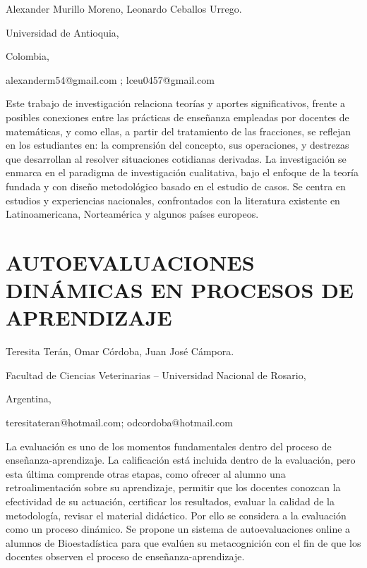\begin{datos}

Alexander Murillo Moreno, Leonardo Ceballos Urrego.

Universidad de Antioquia,

Colombia,

alexanderm54@gmail.com ; lceu0457@gmail.com

\end{datos}

Este trabajo de investigación relaciona teorías y aportes significativos,
frente a posibles conexiones entre las prácticas de enseñanza empleadas
por docentes de matemáticas, y como ellas, a partir del tratamiento
de las fracciones, se reflejan en los estudiantes en: la comprensión
del concepto, sus operaciones, y destrezas que desarrollan al resolver
situaciones cotidianas derivadas. La investigación se enmarca en el
paradigma de investigación cualitativa, bajo el enfoque de la teoría
fundada y con diseño metodológico basado en el estudio de casos. Se
centra en estudios y experiencias nacionales, confrontados con la
literatura existente en Latinoamericana, Norteamérica y algunos países
europeos.


\section{AUTOEVALUACIONES DINÁMICAS EN PROCESOS DE APRENDIZAJE}

\begin{datos}

Teresita Terán, Omar Córdoba, Juan José Cámpora.

Facultad de Ciencias Veterinarias – Universidad Nacional de Rosario,

Argentina,

teresitateran@hotmail.com; odcordoba@hotmail.com

\end{datos}

La evaluación es uno de los momentos fundamentales dentro del proceso
de enseñanza-aprendizaje. La calificación está incluida dentro de
la evaluación, pero esta última comprende otras etapas, como ofrecer
al alumno una retroalimentación sobre su aprendizaje, permitir que
los docentes conozcan la efectividad de su actuación, certificar los
resultados, evaluar la calidad de la metodología, revisar el material
didáctico. Por ello se considera a la evaluación como un proceso dinámico.
Se propone un sistema de autoevaluaciones online a alumnos de Bioestadística
para que evalúen su metacognición con el fin de que los docentes observen
el proceso de enseñanza-aprendizaje.

